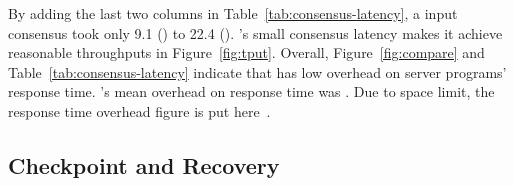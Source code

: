 By adding the last two columns in Table~\ref{tab:consensus-latency}, a 
\xxx input consensus took only 9.1 \us (\redis) to 22.4 \us (\mediatomb). 
\xxx's small consensus latency makes it achieve reasonable throughputs 
in Figure~\ref{fig:tput}. Overall, Figure~\ref{fig:compare} and 
Table~\ref{tab:consensus-latency}  indicate that \xxx has low overhead on 
server programs' response time. \xxx's mean overhead on response time was 
\latencyoverhead. Due to space limit, the response time overhead figure is put 
here~\cite{apus}.














\subsection{Checkpoint and Recovery} \label{sec:robust}

